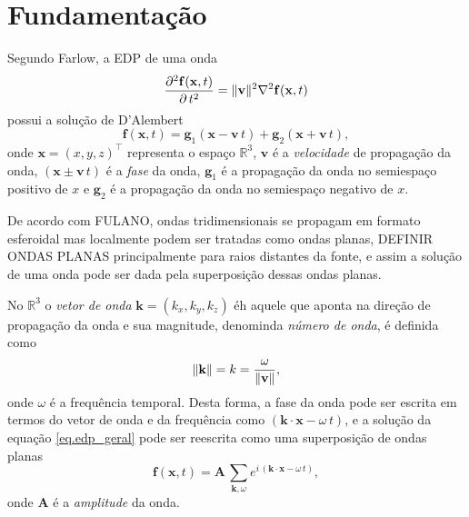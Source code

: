 \chapter{Fundamenta\c{c}\~ao}
Segundo Farlow, a EDP de uma onda 
\begin{equation}\label{eq.edp_geral}
\frac{\partial^2\mathbf{f}(\mathbf{x},t)}{\partial\,t^2}=\lVert\mathbf{v}\rVert^2\nabla^2\mathbf{f}(\mathbf{x},t)
\end{equation}
possui a solu\c{c}\~ao de D'Alembert
\begin{equation}
\mathbf{f}(\mathbf{x},t)=\mathbf{g}_1(\mathbf{x}-\mathbf{v}\,t)+\mathbf{g}_2(\mathbf{x}+\mathbf{v}\,t),
\end{equation}
onde $\mathbf{x}=(x,y,z)^\top$ representa o espa\c{c}o $\mathbb{R}^3$, $\mathbf{v}$ \'e a \textit{velocidade} de propaga\c{c}\~ao da onda, $(\mathbf{x}\pm\mathbf{v}\,t)$ \'e a \textit{fase} da onda, $\mathbf{g}_1$ \'e a propaga\c{c}\~ao da onda no semiespa\c{c}o positivo de $x$ e $\mathbf{g}_2$ \'e a propaga\c{c}\~ao da onda no semiespa\c{c}o negativo de $x$.

De acordo com FULANO, ondas tridimensionais se propagam em formato esferoidal mas localmente podem ser tratadas como ondas planas, DEFINIR ONDAS PLANAS principalmente para raios distantes da fonte, e assim a solu\c{c}\~ao de uma onda pode ser dada pela superposi\c{c}\~ao dessas ondas planas.

No $\mathbb{R}^3$ o \textit{vetor de onda} $\mathbf{k}=(k_x,k_y,k_z)$ \'eh aquele que aponta na dire\c{c}\~ao de propaga\c{c}\~ao da onda e sua magnitude, denominda \textit{n\'umero de onda}, \'e definida como 
\begin{equation}
\lVert\mathbf{k}\rVert=k=\frac{\omega}{\lVert\mathbf{v}\rVert},
\end{equation}
onde $\omega$ \'e a frequ\^encia temporal. Desta forma, a fase da onda pode ser escrita em termos do vetor de onda e da frequ\^encia como $(\mathbf{k}\cdot\mathbf{x}-\omega\,t)$, e a solu\c{c}\~ao da equa\c{c}\~ao \ref{eq.edp_geral} pode ser reescrita como uma superposi\c{c}\~ao de ondas planas
\begin{equation}
\mathbf{f}(\mathbf{x},t)=\mathbf{A}\,\sum_{\mathbf{k},\omega}{e^{i\,(\mathbf{k}\cdot\mathbf{x}-\omega\,t)}},
\end{equation}
onde $\mathbf{A}$ \'e a \textit{amplitude} da onda.



